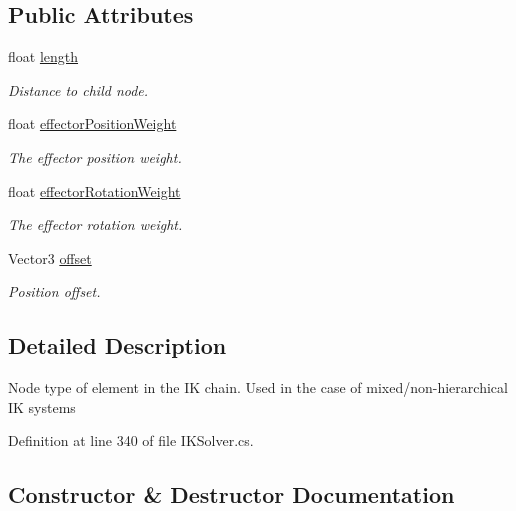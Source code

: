 \subsection*{Public Attributes}
\begin{DoxyCompactItemize}
\item 
float \mbox{\hyperlink{class_root_motion_1_1_final_i_k_1_1_i_k_solver_1_1_node_a9c67ae3e7f25268203b6cb4dca75ba29}{length}}
\begin{DoxyCompactList}\small\item\em Distance to child node. \end{DoxyCompactList}\item 
float \mbox{\hyperlink{class_root_motion_1_1_final_i_k_1_1_i_k_solver_1_1_node_a85487c7d14495f97b8c678613b5a8974}{effector\+Position\+Weight}}
\begin{DoxyCompactList}\small\item\em The effector position weight. \end{DoxyCompactList}\item 
float \mbox{\hyperlink{class_root_motion_1_1_final_i_k_1_1_i_k_solver_1_1_node_a1311d7b9b9837f31e8b2ea38e27a54e2}{effector\+Rotation\+Weight}}
\begin{DoxyCompactList}\small\item\em The effector rotation weight. \end{DoxyCompactList}\item 
Vector3 \mbox{\hyperlink{class_root_motion_1_1_final_i_k_1_1_i_k_solver_1_1_node_a32f649e28e7a75f6f767d989c7854c5a}{offset}}
\begin{DoxyCompactList}\small\item\em Position offset. \end{DoxyCompactList}\end{DoxyCompactItemize}


\subsection{Detailed Description}
Node type of element in the IK chain. Used in the case of mixed/non-\/hierarchical IK systems 



Definition at line 340 of file I\+K\+Solver.\+cs.



\subsection{Constructor \& Destructor Documentation}
\mbox{\label{class_root_motion_1_1_final_i_k_1_1_i_k_solver_1_1_node_a5bf9b323694fea762ca57563d4188c10}} 
